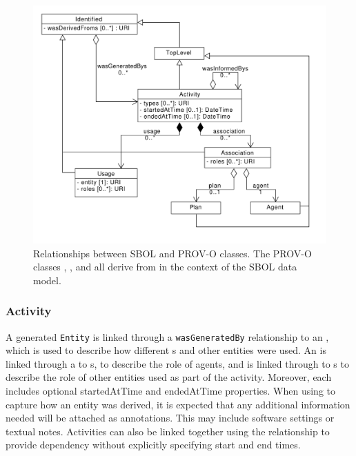 \begin{figure}[ht]
\begin{center}
\includegraphics[scale=0.6]{uml/provenance}
\caption[]{Relationships between SBOL and PROV-O classes. The PROV-O classes , , and  all derive from  in the context of the SBOL data model.
\label{uml:provenance}}
\end{center}
\end{figure}

\subsubsection{Activity}
\label{sec:Activity}

A generated \texttt{Entity} is linked through a \texttt{wasGeneratedBy} relationship to an , which is used to describe how different s and other entities were used. An  is linked through a  to s, to describe the role of agents, and is linked through  to s to describe the role of other entities used as part of the activity. Moreover, each  includes optional startedAtTime and endedAtTime properties. When using  to capture how an entity was derived, it is expected that any additional information needed will be attached as annotations. This may include software settings or textual notes. Activities can also be linked together using the  relationship to provide dependency without explicitly specifying start and end times.

